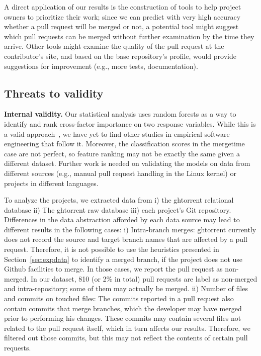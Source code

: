 \documentclass{sig-alternate}
\begin{document}

A direct application of our results is the construction of tools to help project owners to prioritize their work; since we can predict
with very high accuracy whether a pull request will be merged or not, a
potential tool might suggest which pull requests can be merged without further
examination by the time they arrive. Other tools might examine the quality of
the pull request at the contributor's site, and based on the base repository's
profile, would provide suggestions for improvement (e.g., more tests,
documentation). 

\subsection{Threats to validity}

\textbf{Internal validity.} Our statistical analysis uses random forests as a way
to identify and rank cross-factor importance on two response variables. While
this is a valid approach~\cite{Genue10}, we have yet to find other studies in
empirical software engineering that follow it. Moreover, the classification
scores in the \textsf{mergetime} case are not perfect, so feature ranking may
not be exactly the same given a different dataset. Further work is needed on
validating the models on data from different sources (e.g., manual pull
request handling in the Linux kernel) or projects in different languages. 

To analyze the projects, we extracted data from i) the {\sc ght}orrent relational
database ii) The {\sc ght}orrent raw database iii) each project's Git repository.
Differences in the data abstraction afforded by each data source may
lead to different results in the following cases: 
i) Intra-branch merges: {\sc ght}orrent currently does not record the source
    and target branch names that are affected by a pull request. Therefore, it
    is not possible to use the heuristics presented in
    Section~\ref{sec:expdata} to identify a merged branch, if the project
    does not use Github facilities to merge. In those cases, we
    report the pull request as non-merged. In our dataset, 810 (or 2\% in total)
    pull requests are label as non-merged and intra-repository; some of them may
    actually be merged.
ii) Number of files and commits on touched files: The commits reported
    in a pull request also contain commits that merge branches, which the
    developer may have merged prior to performing his changes. These commits
    may contain several files not related to the pull request itself, which
    in turn affects our results. Therefore, we  
    filtered out those commits, but this may not reflect the contents of 
    certain pull requests.
\end{document}
